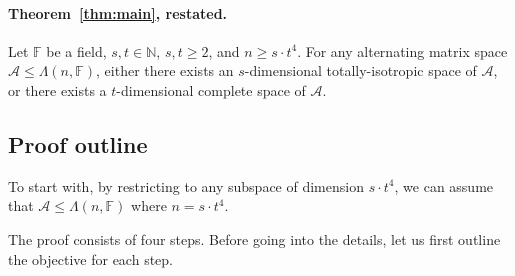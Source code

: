 \documentclass[10pt]{article}
\newcommand{\spa}[1]{\mathcal{#1}}
\newcommand{\F}{\mathbb{F}}
\newcommand{\N}{\mathbb{N}}
\newcommand{\cA}{\spa{A}}
\begin{document}
\paragraph{Theorem~\ref{thm:main}, restated.} Let $\F$ be a field, $s, t\in \N$, 
$s, t\geq 2$, and $n\geq s\cdot t^4$. For any alternating matrix space
$\cA\leq\Lambda(n, \F)$, either there exists an $s$-dimensional totally-isotropic 
space of $\cA$, or there exists a $t$-dimensional complete space of $\cA$.


%
%
%
%


\subsection{Proof outline} 
To start with, by restricting to any subspace of dimension $s\cdot t^4$, we can 
assume that $\cA\leq\Lambda(n, \F)$ where $n=s\cdot t^4$. 

The proof consists of four steps. Before going into the 
details, let us first outline the objective for each step. 

%
%
\end{document}
